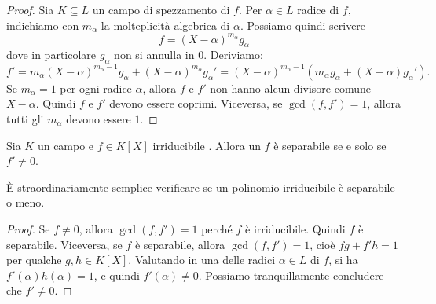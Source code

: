 \begin{proof}
Sia \(K \subseteq L\) un campo di spezzamento di \(f\). Per \(\alpha \in L\) radice di \(f\), indichiamo con \(m_\alpha\) la molteplicità algebrica di \(\alpha\). Possiamo quindi scrivere 
\[f = (X-\alpha)^{m_\alpha} g_\alpha\]
dove in particolare \(g_\alpha\) non si annulla in \(0\). Deriviamo:
\[f' = m_\alpha (X-\alpha)^{m_\alpha -1}g_\alpha + (X-\alpha)^{m_\alpha} g_\alpha' = (X-\alpha)^{m_\alpha -1} \left(m_\alpha g_\alpha + (X-\alpha)g_\alpha'\right) .\]
Se \(m_\alpha = 1\) per ogni radice \(\alpha\), allora \(f\) e \(f'\) non hanno alcun divisore comune \(X-\alpha\). Quindi \(f\) e \(f'\) devono essere coprimi. Viceversa, se \(\gcd(f, f') = 1\), allora tutti gli \(m_\alpha\) devono essere \(1\).
\end{proof}

\begin{prop}\label{prop:PolinomiIrriducibiliSeparabili}
Sia \(K\) un campo e \(f \in K[X]\) irriducibile . Allora un \(f\) è separabile se e solo se \(f' \ne 0\).
\end{prop}

È straordinariamente semplice verificare se un polinomio irriducibile è separabile o meno.

\begin{proof}
Se \(f \ne 0\), allora \(\gcd(f, f') = 1\) perché \(f\) è irriducibile. Quindi \(f\) è separabile. Viceversa, se \(f\) è separabile, allora \(\gcd(f, f') = 1\), cioè \(fg + f'h = 1\) per qualche \(g, h \in K[X]\). Valutando in una delle radici \(\alpha \in L\) di \(f\), si ha \(f'(\alpha) h(\alpha) = 1\), e quindi \(f'(\alpha) \ne 0\). Possiamo tranquillamente concludere che \(f' \ne 0\).
\end{proof}


